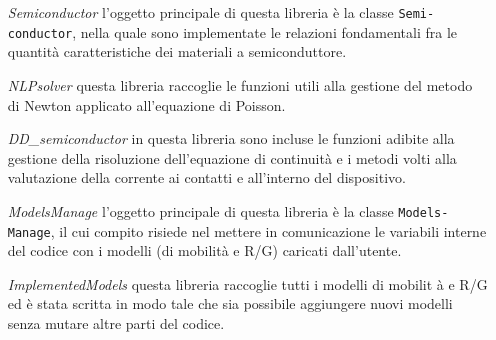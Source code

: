 \begin{itemize}[leftmargin=3.7cm]
\item[\textit{Semiconductor}] l'oggetto principale di questa libreria \`e la classe \texttt{Semi-} \texttt{conductor}, nella quale sono implementate le relazioni fondamentali fra le quantit\`a caratteristiche dei materiali a semiconduttore.

\item[\textit{NLPsolver}] questa libreria raccoglie le funzioni utili alla gestione del metodo di Newton applicato all'equazione di Poisson.

\item[\textit{DD\_semiconductor}]  in questa libreria sono incluse le funzioni adibite alla gestione della risoluzione dell'equazione di continuit\`a e i metodi volti alla valutazione della corrente ai contatti e all'interno del dispositivo.

\item[\textit{ModelsManage}] l'oggetto principale di questa libreria \`e la classe \texttt{Models-} \texttt{Manage}, il cui compito risiede nel mettere in comunicazione le variabili interne del codice con i modelli (di mobilit\`a e R/G) caricati dall'utente.

\item[\textit{ImplementedModels}] questa libreria raccoglie tutti i modelli di mobilit	\`a e R/G ed \`e stata scritta in modo tale che sia possibile aggiungere nuovi modelli senza mutare altre parti del codice.
\end{itemize}

\vspace{1cm}

